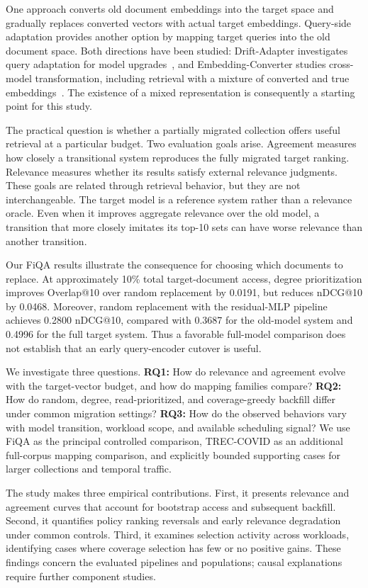 \documentclass[runningheads]{llncs}
\begin{document}
One approach converts old document embeddings into the target space and gradually replaces converted vectors with actual target embeddings. Query-side adaptation provides another option by mapping target queries into the old document space. Both directions have been studied: Drift-Adapter investigates query adaptation for model upgrades~\cite{vejendla-2025-drift}, and Embedding-Converter studies cross-model transformation, including retrieval with a mixture of converted and true embeddings~\cite{yoon-arik-2025-embedding}. The existence of a mixed representation is consequently a starting point for this study.

The practical question is whether a partially migrated collection offers useful retrieval at a particular budget. Two evaluation goals arise. Agreement measures how closely a transitional system reproduces the fully migrated target ranking. Relevance measures whether its results satisfy external relevance judgments. These goals are related through retrieval behavior, but they are not interchangeable. The target model is a reference system rather than a relevance oracle. Even when it improves aggregate relevance over the old model, a transition that more closely imitates its top-10 sets can have worse relevance than another transition.

Our FiQA results illustrate the consequence for choosing which documents to replace. At approximately 10\% total target-document access, degree prioritization improves Overlap@10 over random replacement by 0.0191, but reduces nDCG@10 by 0.0468. Moreover, random replacement with the residual-MLP pipeline achieves 0.2800 nDCG@10, compared with 0.3687 for the old-model system and 0.4996 for the full target system. Thus a favorable full-model comparison does not establish that an early query-encoder cutover is useful.

We investigate three questions. \textbf{RQ1:} How do relevance and agreement evolve with the target-vector budget, and how do mapping families compare? \textbf{RQ2:} How do random, degree, read-prioritized, and coverage-greedy backfill differ under common migration settings? \textbf{RQ3:} How do the observed behaviors vary with model transition, workload scope, and available scheduling signal? We use FiQA as the principal controlled comparison, TREC-COVID as an additional full-corpus mapping comparison, and explicitly bounded supporting cases for larger collections and temporal traffic.

The study makes three empirical contributions. First, it presents relevance and agreement curves that account for bootstrap access and subsequent backfill. Second, it quantifies policy ranking reversals and early relevance degradation under common controls. Third, it examines selection activity across workloads, identifying cases where coverage selection has few or no positive gains. These findings concern the evaluated pipelines and populations; causal explanations require further component studies.
\end{document}
